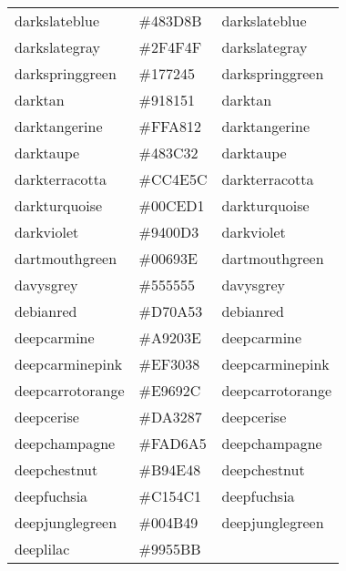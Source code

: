 \documentclass[
]{article}
\begin{document}
\begin{longtable}[]{@{}lll@{}}
darkslateblue & \colorbox[rgb]{0.28,0.24,0.55}{\#483D8B} &
\textcolor[rgb]{0.28,0.24,0.55}{darkslateblue         }\tabularnewline
darkslategray & \colorbox[rgb]{0.18,0.31,0.31}{\#2F4F4F} &
\textcolor[rgb]{0.18,0.31,0.31}{darkslategray         }\tabularnewline
darkspringgreen & \colorbox[rgb]{0.09,0.45,0.27}{\#177245} &
\textcolor[rgb]{0.09,0.45,0.27}{darkspringgreen       }\tabularnewline
darktan & \colorbox[rgb]{0.57,0.51,0.32}{\#918151} &
\textcolor[rgb]{0.57,0.51,0.32}{darktan               }\tabularnewline
darktangerine & \colorbox[rgb]{1.0,0.66,0.07}{\#FFA812} &
\textcolor[rgb]{1.0,0.66,0.07}{darktangerine         }\tabularnewline
darktaupe & \colorbox[rgb]{0.28,0.24,0.2}{\#483C32} &
\textcolor[rgb]{0.28,0.24,0.2}{darktaupe             }\tabularnewline
darkterracotta & \colorbox[rgb]{0.8,0.31,0.36}{\#CC4E5C} &
\textcolor[rgb]{0.8,0.31,0.36}{darkterracotta        }\tabularnewline
darkturquoise & \colorbox[rgb]{0.0,0.81,0.82}{\#00CED1} &
\textcolor[rgb]{0.0,0.81,0.82}{darkturquoise         }\tabularnewline
darkviolet & \colorbox[rgb]{0.58,0.0,0.83}{\#9400D3} &
\textcolor[rgb]{0.58,0.0,0.83}{darkviolet            }\tabularnewline
dartmouthgreen & \colorbox[rgb]{0.05,0.5,0.06}{\#00693E} &
\textcolor[rgb]{0.05,0.5,0.06}{dartmouthgreen        }\tabularnewline
davysgrey & \colorbox[rgb]{0.33,0.33,0.33}{\#555555} &
\textcolor[rgb]{0.33,0.33,0.33}{davysgrey             }\tabularnewline
debianred & \colorbox[rgb]{0.84,0.04,0.33}{\#D70A53} &
\textcolor[rgb]{0.84,0.04,0.33}{debianred             }\tabularnewline
deepcarmine & \colorbox[rgb]{0.66,0.13,0.24}{\#A9203E} &
\textcolor[rgb]{0.66,0.13,0.24}{deepcarmine           }\tabularnewline
deepcarminepink & \colorbox[rgb]{0.94,0.19,0.22}{\#EF3038} &
\textcolor[rgb]{0.94,0.19,0.22}{deepcarminepink       }\tabularnewline
deepcarrotorange & \colorbox[rgb]{0.91,0.41,0.17}{\#E9692C} &
\textcolor[rgb]{0.91,0.41,0.17}{deepcarrotorange      }\tabularnewline
deepcerise & \colorbox[rgb]{0.85,0.2,0.53}{\#DA3287} &
\textcolor[rgb]{0.85,0.2,0.53}{deepcerise            }\tabularnewline
deepchampagne & \colorbox[rgb]{0.98,0.84,0.65}{\#FAD6A5} &
\textcolor[rgb]{0.98,0.84,0.65}{deepchampagne         }\tabularnewline
deepchestnut & \colorbox[rgb]{0.73,0.31,0.28}{\#B94E48} &
\textcolor[rgb]{0.73,0.31,0.28}{deepchestnut          }\tabularnewline
deepfuchsia & \colorbox[rgb]{0.76,0.33,0.76}{\#C154C1} &
\textcolor[rgb]{0.76,0.33,0.76}{deepfuchsia           }\tabularnewline
deepjunglegreen & \colorbox[rgb]{0.0,0.29,0.29}{\#004B49} &
\textcolor[rgb]{0.0,0.29,0.29}{deepjunglegreen       }\tabularnewline
deeplilac & \colorbox[rgb]{0.6,0.33,0.73}{\#9955BB} &

\end{longtable}
\end{document}
